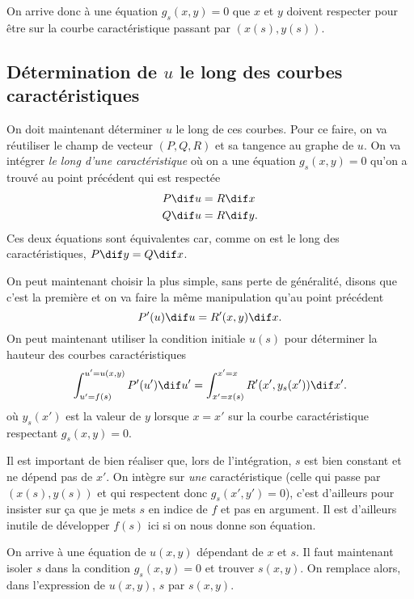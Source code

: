 On arrive donc à une équation $g_s(x, y) = 0$ que $x$ et $y$ doivent
respecter pour être sur la courbe caractéristique passant par $(x(s), y(s))$.

\subsection{Détermination de $u$ le long des courbes caractéristiques}
On doit maintenant déterminer $u$ le long de ces courbes.
Pour ce faire, on va réutiliser le champ de vecteur $(P, Q, R)$ et sa
tangence au graphe de $u$.
On va intégrer \emph{le long d'une caractéristique} où on a
une équation $g_s(x, y) = 0$ qu'on a trouvé au point précédent
qui est respectée
\begin{align*}
  P \dif u & = R \dif x\\
  Q \dif u & = R \dif y.
\end{align*}
Ces deux équations sont équivalentes car, comme on est le long des
caractéristiques, $P \dif y = Q \dif x$.

On peut maintenant choisir la plus simple,
sans perte de généralité, disons que c'est la première et
on va faire la même manipulation qu'au point précédent
\[ P'(u) \dif u = R'(x, y) \dif x. \]
On peut maintenant utiliser la condition initiale $u(s)$ pour
déterminer la hauteur des courbes caractéristiques
\[ \int_{u' = f(s)}^{u' = u(x,y)} P'(u') \dif u'
= \int_{x' = x(s)}^{x' = x} R'(x', y_s(x')) \dif x'. \]
où $y_s(x')$ est la valeur de $y$ lorsque $x = x'$
sur la courbe caractéristique respectant $g_s(x, y) = 0$.

\begin{myrem}
  Il est important de bien réaliser que, lors de l'intégration,
  $s$ est bien constant et ne dépend pas de $x'$.
  On intègre sur \emph{une} caractéristique
  (celle qui passe par $(x(s), y(s))$ et qui respectent donc
  $g_s(x', y') = 0$), c'est d'ailleurs pour insister sur ça que je mets
  $s$ en indice de $f$ et pas en argument.
  Il est d'ailleurs inutile de développer $f(s)$ ici si on nous donne
  son équation.
\end{myrem}

On arrive à une équation de $u(x, y)$ dépendant de $x$ et $s$.
Il faut maintenant isoler $s$ dans la condition $g_s(x, y) = 0$ et trouver
$s(x, y)$.
On remplace alors, dans l'expression de $u(x, y)$, $s$ par $s(x, y)$.

